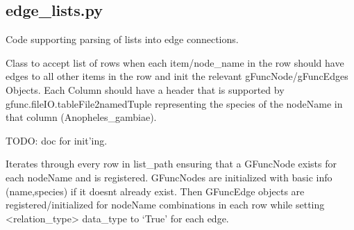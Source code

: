 \documentclass[letterpaper,10pt,english]{sphinxmanual}
\begin{document}
\label{code:module-gfunc.parsers.edge_lists}

\subsection{edge\_lists.py}
\label{code:edge-lists-py}
Code supporting parsing of lists into edge connections.

\begin{fulllineitems}
\label{code:gfunc.parsers.edge_lists.OneToOneOrthoListParser}
Class to accept list of rows when each item/node\_name in the row should have edges to all other items in the row
and init the relevant gFuncNode/gFuncEdges Objects.  Each Column should have a header that is supported
by gfunc.fileIO.tableFile2namedTuple representing the species of the nodeName in that column (Anopheles\_gambiae).

\begin{fulllineitems}
\label{code:gfunc.parsers.edge_lists.OneToOneOrthoListParser.__init__}
TODO: doc for init'ing.

\end{fulllineitems}


\begin{fulllineitems}
\label{code:gfunc.parsers.edge_lists.OneToOneOrthoListParser.resgister_nodes_and_edges}
Iterates through every row in list\_path ensuring that
a GFuncNode exists for each nodeName and is registered.  GFuncNodes are
initialized with basic info (name,species) if it doesnt already exist.
Then GFuncEdge objects are registered/initialized for nodeName combinations
in each row while setting \textless{}relation\_type\textgreater{} data\_type to `True' for each edge.

\end{fulllineitems}


\end{fulllineitems}
\end{document}
